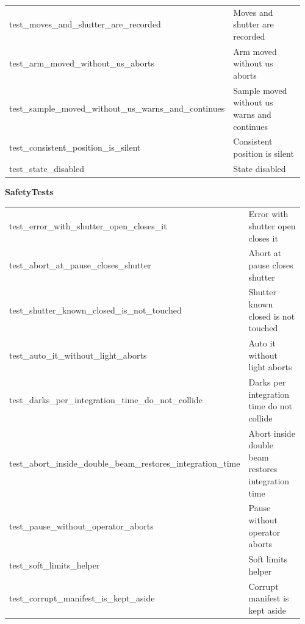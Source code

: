\begin{longtable}{@{}>{\ttfamily\scriptsize\raggedright\arraybackslash}p{0.40\linewidth} >{\footnotesize\raggedright\arraybackslash}p{0.555\linewidth}@{}}
test\_\allowbreak{}moves\_\allowbreak{}and\_\allowbreak{}shutter\_\allowbreak{}are\_\allowbreak{}recorded & Moves and shutter are recorded \\
test\_\allowbreak{}arm\_\allowbreak{}moved\_\allowbreak{}without\_\allowbreak{}us\_\allowbreak{}aborts & Arm moved without us aborts \\
test\_\allowbreak{}sample\_\allowbreak{}moved\_\allowbreak{}without\_\allowbreak{}us\_\allowbreak{}warns\_\allowbreak{}and\_\allowbreak{}continues & Sample moved without us warns and continues \\
test\_\allowbreak{}consistent\_\allowbreak{}position\_\allowbreak{}is\_\allowbreak{}silent & Consistent position is silent \\
test\_\allowbreak{}state\_\allowbreak{}disabled & State disabled \\
\end{longtable}
\par\smallskip \textbf{SafetyTests} \par\nopagebreak\smallskip
\begin{longtable}{@{}>{\ttfamily\scriptsize\raggedright\arraybackslash}p{0.40\linewidth} >{\footnotesize\raggedright\arraybackslash}p{0.555\linewidth}@{}}
test\_\allowbreak{}error\_\allowbreak{}with\_\allowbreak{}shutter\_\allowbreak{}open\_\allowbreak{}closes\_\allowbreak{}it & Error with shutter open closes it \\
test\_\allowbreak{}abort\_\allowbreak{}at\_\allowbreak{}pause\_\allowbreak{}closes\_\allowbreak{}shutter & Abort at pause closes shutter \\
test\_\allowbreak{}shutter\_\allowbreak{}known\_\allowbreak{}closed\_\allowbreak{}is\_\allowbreak{}not\_\allowbreak{}touched & Shutter known closed is not touched \\
test\_\allowbreak{}auto\_\allowbreak{}it\_\allowbreak{}without\_\allowbreak{}light\_\allowbreak{}aborts & Auto it without light aborts \\
test\_\allowbreak{}darks\_\allowbreak{}per\_\allowbreak{}integration\_\allowbreak{}time\_\allowbreak{}do\_\allowbreak{}not\_\allowbreak{}collide & Darks per integration time do not collide \\
test\_\allowbreak{}abort\_\allowbreak{}inside\_\allowbreak{}double\_\allowbreak{}beam\_\allowbreak{}restores\_\allowbreak{}integration\_\allowbreak{}time & Abort inside double beam restores integration time \\
test\_\allowbreak{}pause\_\allowbreak{}without\_\allowbreak{}operator\_\allowbreak{}aborts & Pause without operator aborts \\
test\_\allowbreak{}soft\_\allowbreak{}limits\_\allowbreak{}helper & Soft limits helper \\
test\_\allowbreak{}corrupt\_\allowbreak{}manifest\_\allowbreak{}is\_\allowbreak{}kept\_\allowbreak{}aside & Corrupt manifest is kept aside \\
\end{longtable}
